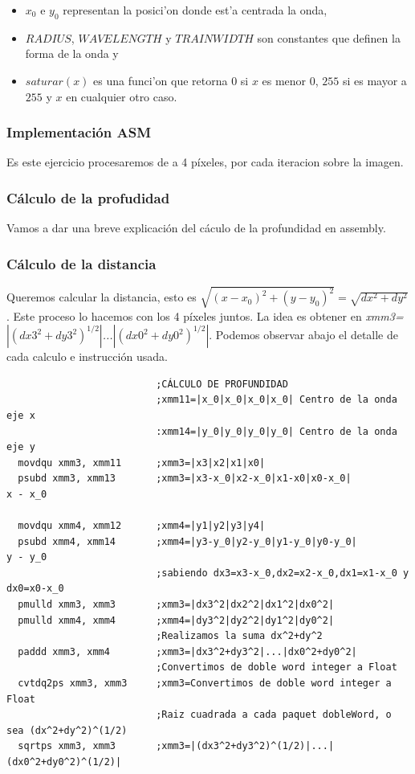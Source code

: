 \begin{itemize}
  \item $x_0$ e $y_0$ representan la posici'on donde est'a centrada la onda,
  \item $RADIUS$, $WAVELENGTH$ y $TRAINWIDTH$ son constantes que definen la 
  forma de la onda y
  \item $saturar(x)$ es una funci'on que retorna $0$ si $x$ es menor $0$, $255$
  si es mayor a $255$ y $x$ en cualquier otro caso.
\end{itemize}

\newpage
\subsubsection{Implementación ASM}
Es este ejercicio procesaremos de a 4 píxeles, por cada iteracion sobre la imagen.
\subsubsection*{Cálculo de la profudidad}
Vamos a dar una breve explicación del cáculo de la profundidad en assembly.

\subsubsection*{Cálculo de la distancia}

Queremos calcular la distancia, esto es $\sqrt{(x-x_0)^2+(y-y_0)^2} = \sqrt{dx^2+dy^2}$. Este proceso lo hacemos con los 4 píxeles juntos. La idea es obtener en \emph{xmm3=$|(dx3^2+dy3^2)^{1/2}|$...$|(dx0^2+dy0^2)^{1/2}|$}. Podemos observar abajo el detalle de cada calculo e instrucción usada.
\begin{codesnippet}
\begin{verbatim}
                          ;CÁLCULO DE PROFUNDIDAD
                          ;xmm11=|x_0|x_0|x_0|x_0| Centro de la onda eje x
                          :xmm14=|y_0|y_0|y_0|y_0| Centro de la onda eje y
  movdqu xmm3, xmm11      ;xmm3=|x3|x2|x1|x0| 
  psubd xmm3, xmm13       ;xmm3=|x3-x_0|x2-x_0|x1-x0|x0-x_0|                    x - x_0
            
  movdqu xmm4, xmm12      ;xmm4=|y1|y2|y3|y4|
  psubd xmm4, xmm14       ;xmm4=|y3-y_0|y2-y_0|y1-y_0|y0-y_0|                     y - y_0	
                          ;sabiendo dx3=x3-x_0,dx2=x2-x_0,dx1=x1-x_0 y dx0=x0-x_0
  pmulld xmm3, xmm3       ;xmm3=|dx3^2|dx2^2|dx1^2|dx0^2|
  pmulld xmm4, xmm4       ;xmm4=|dy3^2|dy2^2|dy1^2|dy0^2|
                          ;Realizamos la suma dx^2+dy^2
  paddd xmm3, xmm4        ;xmm3=|dx3^2+dy3^2|...|dx0^2+dy0^2|
                          ;Convertimos de doble word integer a Float
  cvtdq2ps xmm3, xmm3     ;xmm3=Convertimos de doble word integer a Float
                          ;Raiz cuadrada a cada paquet dobleWord, o sea (dx^2+dy^2)^(1/2)
  sqrtps xmm3, xmm3       ;xmm3=|(dx3^2+dy3^2)^(1/2)|...|(dx0^2+dy0^2)^(1/2)|
\end{verbatim}
\end{codesnippet}

